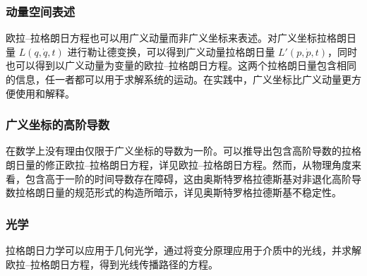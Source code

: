 \subsubsection{动量空间表述}
欧拉–拉格朗日方程也可以用广义动量而非广义坐标来表述。对广义坐标拉格朗日量 \( L(q, \dot{q}, t) \) 进行勒让德变换，可以得到广义动量拉格朗日量 \( L'(p, \dot{p}, t) \)，同时也可以得到以广义动量为变量的欧拉–拉格朗日方程。这两个拉格朗日量包含相同的信息，任一者都可以用于求解系统的运动。在实践中，广义坐标比广义动量更方便使用和解释。
\subsubsection{广义坐标的高阶导数}
在数学上没有理由仅限于广义坐标的导数为一阶。可以推导出包含高阶导数的拉格朗日量的修正欧拉–拉格朗日方程，详见欧拉–拉格朗日方程。然而，从物理角度来看，包含高于一阶的时间导数存在障碍，这由奥斯特罗格拉德斯基对非退化高阶导数拉格朗日量的规范形式的构造所暗示，详见奥斯特罗格拉德斯基不稳定性。
\subsubsection{光学}
拉格朗日力学可以应用于几何光学，通过将变分原理应用于介质中的光线，并求解欧拉–拉格朗日方程，得到光线传播路径的方程。
